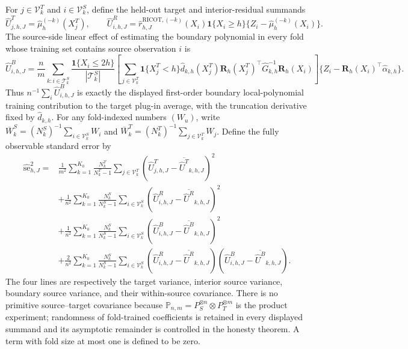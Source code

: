 For \(j\in\mathcal V^T_k\) and \(i\in\mathcal V^S_k\), define the held-out target and interior-residual summands \[\widehat U^T_{j,h,J}=\widehat\mu_h^{(-k)}(X_j^T),\qquad \widehat U^R_{i,h,J}=\widehat r^{\mathrm{RICOT},(-k)}_{h,J}(X_i)\mathbf 1\{X_i\ge h\}\{Z_i-\widehat\mu_h^{(-k)}(X_i)\}.\] The source-side linear effect of estimating the boundary polynomial in every fold whose training set contains source observation \(i\) is \[\widehat U^B_{i,h,J}=\frac{n}{m}\sum_{k:i\in\mathcal T^S_k}\frac{\mathbf 1\{X_i\le2h\}}{|\mathcal T^S_k|}\left[\sum_{j\in\mathcal V^T_k}\mathbf 1\{X_j^T<h\}\widehat d_{k,h}(X_j^T)\mathbf R_h(X_j^T)^\top\widehat G_{k,h}^{-1}\mathbf R_h(X_i)\right]\{Z_i-\mathbf R_h(X_i)^\top\widehat\alpha_{k,h}\}.\] Thus \(n^{-1}\sum_i\widehat U^B_{i,h,J}\) is exactly the displayed first-order boundary local-polynomial training contribution to the target plug-in average, with the truncation derivative fixed by \(\widehat d_{k,h}\). For any fold-indexed numbers \((W_u)\), write \(\overline W_k^S=(N_k^S)^{-1}\sum_{i\in\mathcal V^S_k}W_i\) and \(\overline W_k^T=(N_k^T)^{-1}\sum_{j\in\mathcal V^T_k}W_j\). Define the fully observable standard error by \[\begin{aligned}\widehat{\mathrm{se}}_{h,J}^2={}&\frac1{m^2}\sum_{k=1}^{K_0}\frac{N_k^T}{N_k^T-1}\sum_{j\in\mathcal V^T_k}(\widehat U^T_{j,h,J}-\overline{\widehat U^T}_{k,h,J})^2\\&+\frac1{n^2}\sum_{k=1}^{K_0}\frac{N_k^S}{N_k^S-1}\sum_{i\in\mathcal V^S_k}(\widehat U^R_{i,h,J}-\overline{\widehat U^R}_{k,h,J})^2\\&+\frac1{n^2}\sum_{k=1}^{K_0}\frac{N_k^S}{N_k^S-1}\sum_{i\in\mathcal V^S_k}(\widehat U^B_{i,h,J}-\overline{\widehat U^B}_{k,h,J})^2\\&+\frac2{n^2}\sum_{k=1}^{K_0}\frac{N_k^S}{N_k^S-1}\sum_{i\in\mathcal V^S_k}(\widehat U^R_{i,h,J}-\overline{\widehat U^R}_{k,h,J})(\widehat U^B_{i,h,J}-\overline{\widehat U^B}_{k,h,J}).\end{aligned}\] The four lines are respectively the target variance, interior source variance, boundary source variance, and their within-source covariance. There is no primitive source--target covariance because \(\mathbb P_{n,m}=P_S^{\otimes n}\otimes P_T^{\otimes m}\) is the product experiment; randomness of fold-trained coefficients is retained in every displayed summand and its asymptotic remainder is controlled in the honesty theorem. A term with fold size at most one is defined to be zero.